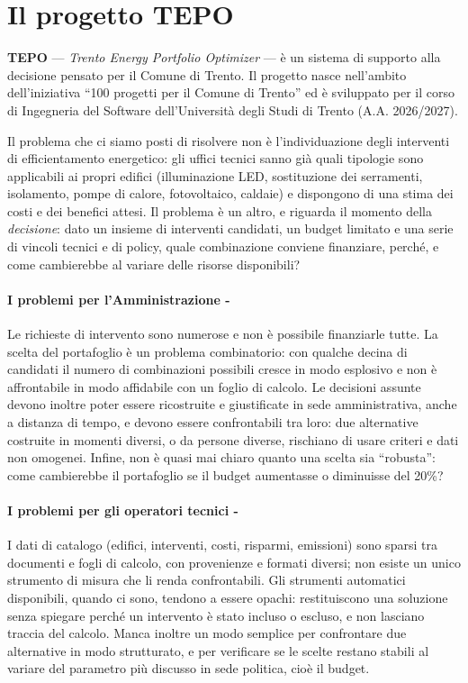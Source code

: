 \section{Il progetto TEPO}
\label{sec:progetto}

\textbf{TEPO} --- \emph{Trento Energy Portfolio Optimizer} --- è un sistema di supporto alla decisione pensato per il Comune di Trento. Il progetto nasce nell'ambito dell'iniziativa ``100 progetti per il Comune di Trento'' ed è sviluppato per il corso di Ingegneria del Software dell'Università degli Studi di Trento (A.A. 2026/2027).

Il problema che ci siamo posti di risolvere non è l'individuazione degli interventi di efficientamento energetico: gli uffici tecnici sanno già quali tipologie sono applicabili ai propri edifici (illuminazione LED, sostituzione dei serramenti, isolamento, pompe di calore, fotovoltaico, caldaie) e dispongono di una stima dei costi e dei benefici attesi. Il problema è un altro, e riguarda il momento della \emph{decisione}: dato un insieme di interventi candidati, un budget limitato e una serie di vincoli tecnici e di policy, quale combinazione conviene finanziare, perché, e come cambierebbe al variare delle risorse disponibili?

\paragraph*{I problemi per l'Amministrazione -}
Le richieste di intervento sono numerose e non è possibile finanziarle tutte. La scelta del portafoglio è un problema combinatorio: con qualche decina di candidati il numero di combinazioni possibili cresce in modo esplosivo e non è affrontabile in modo affidabile con un foglio di calcolo. Le decisioni assunte devono inoltre poter essere ricostruite e giustificate in sede amministrativa, anche a distanza di tempo, e devono essere confrontabili tra loro: due alternative costruite in momenti diversi, o da persone diverse, rischiano di usare criteri e dati non omogenei. Infine, non è quasi mai chiaro quanto una scelta sia ``robusta'': come cambierebbe il portafoglio se il budget aumentasse o diminuisse del 20\%?

\paragraph*{I problemi per gli operatori tecnici -}
I dati di catalogo (edifici, interventi, costi, risparmi, emissioni) sono sparsi tra documenti e fogli di calcolo, con provenienze e formati diversi; non esiste un unico strumento di misura che li renda confrontabili. Gli strumenti automatici disponibili, quando ci sono, tendono a essere opachi: restituiscono una soluzione senza spiegare perché un intervento è stato incluso o escluso, e non lasciano traccia del calcolo. Manca inoltre un modo semplice per confrontare due alternative in modo strutturato, e per verificare se le scelte restano stabili al variare del parametro più discusso in sede politica, cioè il budget.

